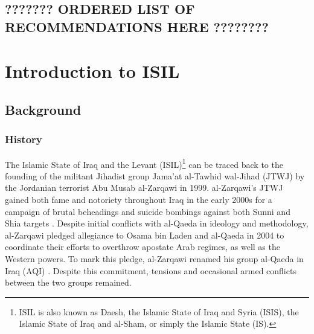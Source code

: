 \documentclass{report}
\begin{document}
\section{??????? ORDERED LIST OF RECOMMENDATIONS HERE ????????}






\chapter{Introduction to ISIL}





   
   

    
    
    
    \section{Background}
    
    \subsection{History}
    
    The Islamic State of Iraq and the Levant (ISIL)\footnote{ISIL is also known as Daesh, the Islamic State of Iraq and Syria (ISIS),  the Islamic State of Iraq and al-Sham, or simply the Islamic State (IS).} can be traced back to the founding of the militant Jihadist group Jama'at al-Tawhid wal-Jihad (JTWJ) by the Jordanian terrorist Abu Musab al-Zarqawi in 1999. al-Zarqawi's JTWJ gained both fame and notoriety throughout Iraq in the early 2000s for  a campaign of brutal beheadings and suicide bombings against both Sunni and Shia targets \cite{Zelin2014}. Despite initial conflicts with al-Qaeda in ideology and methodology, al-Zarqawi pledged allegiance to Osama bin Laden and al-Qaeda in 2004 to coordinate  their efforts to overthrow apostate Arab regimes, as well as the Western powers. To mark this pledge, al-Zarqawi renamed his group al-Qaeda in Iraq  (AQI) \cite{Gambill2004}. Despite this commitment, tensions and occasional armed conflicts between the two groups remained.
    
\end{document}
